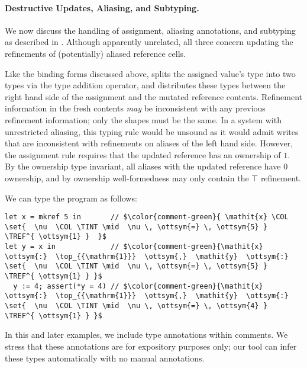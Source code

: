 \paragraph{Destructive Updates, Aliasing, and Subtyping.}
We now discuss the handling of assignment, aliasing annotations,
and subtyping as described in .
Although apparently unrelated, all three concern
updating the refinements of (potentially) aliased reference cells.

Like the binding forms discussed above,  splits the assigned
value's type into two types via the type addition operator,
and distributes these types between the right hand side of the
assignment and the mutated reference contents.
Refinement information in the fresh
contents \emph{may} be inconsistent with
any previous refinement information; only the shapes must be the same.
In a system with unrestricted aliasing, this
typing rule would be unsound as it would admit writes that
are inconsistent with refinements on aliases of the left hand side.
However, the assignment rule
requires that the updated reference has an ownership of $1$.
By the ownership type invariant, all aliases
with the updated reference have $0$ ownership, and
by ownership well-formedness may only contain the $ \top $ refinement.

\begin{example}
  We can type the program as follows:
\begin{lstlisting}
let x = mkref 5 in       // $\color{comment-green}{ \mathit{x} \COL   \set{  \nu  \COL \TINT \mid  \nu \, \ottsym{=} \, \ottsym{5} }   \TREF^{ \ottsym{1} }  }$
let y = x in             // $\color{comment-green}{\mathit{x}  \ottsym{:}  \top_{{\mathrm{1}}}  \ottsym{,}  \mathit{y}  \ottsym{:}    \set{  \nu  \COL \TINT \mid  \nu \, \ottsym{=} \, \ottsym{5} }   \TREF^{ \ottsym{1} } }$
  y := 4; assert(*y = 4) // $\color{comment-green}{\mathit{x}  \ottsym{:}  \top_{{\mathrm{1}}}  \ottsym{,}  \mathit{y}  \ottsym{:}    \set{  \nu  \COL \TINT \mid  \nu \, \ottsym{=} \, \ottsym{4} }   \TREF^{ \ottsym{1} } }$
\end{lstlisting}
  In this and later examples, we include type annotations within comments. We stress
  that these annotations are for expository purposes only; our tool can infer these types
  automatically with no manual annotations.
\end{example}

